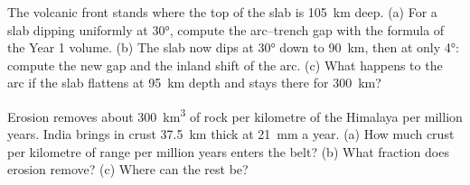 \begin{exercise}[$\star\star\star$]\label{exo:b2:himalaya-andes:11}
The volcanic front stands where the top of the slab is \qty{105}{km} deep. (a) For a slab
dipping uniformly at \ang{30}, compute the arc--trench gap with the formula of the Year 1
volume. (b) The slab now dips at \ang{30} down to \qty{90}{km}, then at only \ang{4}: compute
the new gap and the inland shift of the arc. (c) What happens to the arc if the slab flattens
at \qty{95}{km} depth and stays there for \qty{300}{km}?
\end{exercise}

\begin{exercise}[$\star\star\star$]\label{exo:b2:himalaya-andes:12}
Erosion removes about \qty{300}{km^3} of rock per kilometre of the Himalaya per million years.
India brings in crust \qty{37.5}{km} thick at \qty{21}{mm} a year. (a) How much crust per
kilometre of range per million years enters the belt? (b) What fraction does erosion remove?
(c) Where can the rest be?
\end{exercise}

